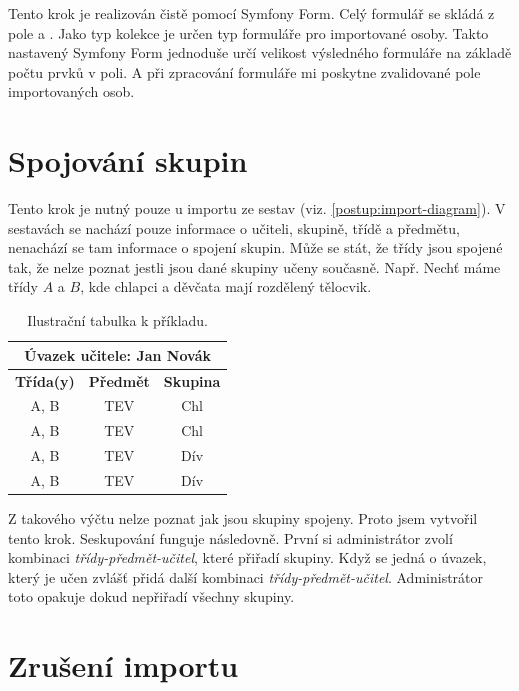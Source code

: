 Tento krok je realizován čistě pomocí Symfony Form. Celý formulář se skládá z pole  a .
  Jako typ kolekce je určen typ formuláře pro importované osoby. Takto nastavený Symfony Form jednoduše určí velikost výsledného formuláře na základě počtu prvků v poli. A při zpracování formuláře mi poskytne zvalidované pole importovaných osob.

\section{Spojování skupin}\label{postup:spojovani-skupin}

Tento krok je nutný pouze u importu ze sestav (viz. \ref{postup:import-diagram}).
V sestavách se nachází pouze informace o učiteli, skupině, třídě a předmětu, nenachází se tam informace o spojení skupin.
Může se stát, že třídy jsou spojené tak, že nelze poznat jestli jsou dané skupiny učeny současně.
Např. Nechť máme třídy $A$ a $B$, kde chlapci a děvčata mají rozdělený tělocvik.

\begin{table}[h!]
\centering
\begin{tabular}{ | c | c | c | }
\hline
 \multicolumn{3}{|c|}{\textbf{Úvazek učitele:} Jan Novák}\\
     \hline
 \textbf{Třída(y)} & \textbf{Předmět} & \textbf{Skupina}\\
 \hline
 A, B & TEV & Chl \\ 
 \hline
 A, B & TEV & Chl \\  
 \hline
 A, B & TEV & Dív \\ 
 \hline
 A, B & TEV & Dív \\  
 \hline
\end{tabular}
\caption{Ilustrační tabulka k příkladu.}
\end{table}

Z takového výčtu nelze poznat jak jsou skupiny spojeny.
Proto jsem vytvořil tento krok. 
Seskupování funguje následovně.
První si administrátor zvolí kombinaci \textit{třídy-předmět-učitel}, které přiřadí skupiny. 
Když se jedná o úvazek, který je učen zvlášť přidá další kombinaci \textit{třídy-předmět-učitel}. Administrátor toto opakuje dokud nepřiřadí všechny skupiny.

\section{Zrušení importu}

